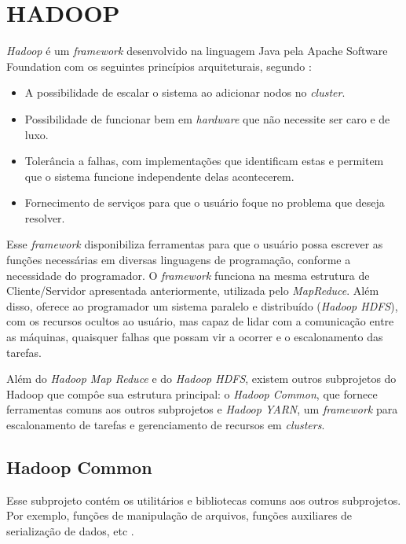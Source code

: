 
\section{HADOOP} \label{sec:hadoop}

\textit{Hadoop} é um \textit{\gls{framework}} desenvolvido na linguagem Java pela Apache Software Foundation com os seguintes princípios arquiteturais, segundo \textcite{ImprovingNavarro18}:
\begin{itemize}
  \item A possibilidade de escalar o sistema ao adicionar nodos no \textit{cluster}.
  \item Possibilidade de funcionar bem em \textit{hardware} que não necessite ser caro e de luxo.
  \item Tolerância a falhas, com implementações que identificam estas e permitem que o sistema funcione independente delas acontecerem.
  \item Fornecimento de serviços para que o usuário foque no problema que deseja resolver.
\end{itemize}

Esse \textit{\gls{framework}} disponibiliza ferramentas para que o usuário possa escrever as funções necessárias em diversas linguagens de programação, conforme a necessidade do programador. O \textit{\gls{framework}} funciona na mesma estrutura de Cliente/Servidor apresentada anteriormente, utilizada pelo \textit{MapReduce}. Além disso, oferece ao programador um sistema paralelo e distribuído (\textit{Hadoop HDFS}), com os recursos ocultos ao usuário, mas capaz de lidar com a comunicação entre as máquinas, quaisquer falhas que possam vir a ocorrer e o escalonamento das tarefas.

Além do \textit{Hadoop Map Reduce} e do \textit{Hadoop HDFS}, existem outros subprojetos do Hadoop que compôe sua estrutura principal: o \textit{Hadoop Common}, que fornece ferramentas comuns aos outros subprojetos e \textit{Hadoop YARN}, um \textit{\gls{framework}} para escalonamento de tarefas e gerenciamento de recursos em \textit{clusters}.

\subsection{Hadoop Common}\label{ssec:hadoopcommon}

Esse subprojeto contém os utilitários e bibliotecas comuns aos outros subprojetos. Por exemplo, funções de manipulação de arquivos, funções auxiliares de serialização de dados, etc \cite{GoldmanApache12}.

